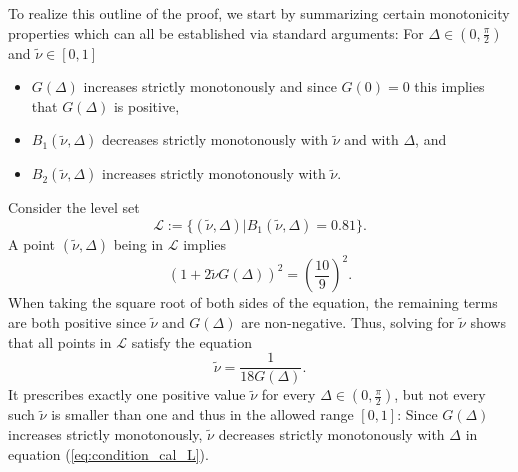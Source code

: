 \documentclass{article}
\begin{document}
To realize this outline of the proof, we start by summarizing certain monotonicity properties which can all be established via standard arguments:
For $\Delta\in(0,\frac\pi 2)$ and $\tilde\nu\in[0,1]$
\begin{itemize}
    \item $G(\Delta)$ increases strictly monotonously and since $G(0)=0$ this implies that $G(\Delta)$ is positive,
    \item $B_1(\tilde\nu, \Delta)$ decreases strictly monotonously with $\tilde\nu$ and with $\Delta$, and
    \item $B_2(\tilde\nu, \Delta)$ increases strictly monotonously with $\tilde\nu$.
\end{itemize}
Consider the level set
\[\mathcal{L} := \{(\tilde\nu,\Delta)|B_1(\tilde\nu,\Delta) = 0.81\}.\]
A point $(\tilde\nu,\Delta)$ being in $\mathcal{L}$ implies
\[(1+2\tilde\nu G(\Delta))^2 = \left(\frac{10}{9}\right)^2.\]
When taking the square root of both sides of the equation, the remaining terms are both positive since $\tilde\nu$ and $G(\Delta)$ are non-negative. Thus, solving for $\tilde\nu$ shows that all points in $\mathcal{L}$ satisfy the equation
\begin{equation} \label{eq:condition_cal_L}
    \tilde\nu =\frac{1}{18G(\Delta)}.
\end{equation}
It prescribes exactly one positive value $\tilde\nu$ for every $\Delta\in(0,\frac\pi 2)$, but not every such $\tilde\nu$ is smaller than one and thus in the allowed range $[0,1]$: 
Since $G(\Delta)$ increases strictly monotonously, $\tilde\nu$ decreases strictly monotonously with $\Delta$ in equation (\ref{eq:condition_cal_L}).
\end{document}
